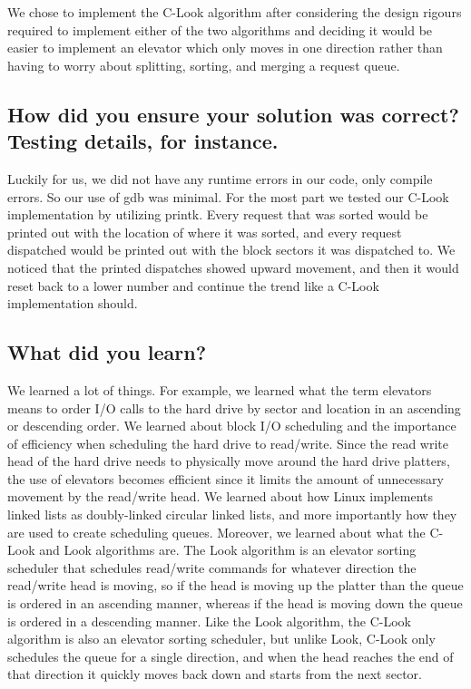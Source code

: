 \documentclass[onecolumn, draftclsnofoot,10pt, compsoc]{IEEEtran}
\begin{document}
We chose to implement the C-Look algorithm after considering the design rigours required to implement either of the two algorithms and deciding it would be easier to implement an elevator which only moves in one direction rather than having to worry about splitting, sorting, and merging a request queue.

\subsection{How did you ensure your solution was correct? Testing details, for instance.}

Luckily for us, we did not have any runtime errors in our code, only compile errors. So our use of gdb was minimal. For the most part we tested our C-Look implementation by utilizing printk. Every request that was sorted would be printed out with the location of where it was sorted, and every request dispatched would be printed out with the block sectors it was dispatched to. We noticed that the printed dispatches showed upward movement, and then it would reset back to a lower number and continue the trend like a C-Look implementation should.

\subsection{What did you learn?}

We learned a lot of things. For example, we learned what the term elevators means to order I/O calls to the hard drive by sector and location in an ascending or descending order. We learned about block I/O scheduling and the importance of efficiency when scheduling the hard drive to read/write. Since the read write head of the hard drive needs to physically move around the hard drive platters, the use of elevators becomes efficient since it limits the amount of unnecessary movement by the read/write head. We learned about how Linux implements linked lists as doubly-linked circular linked lists, and more importantly how they are used to create scheduling queues. Moreover, we learned about what the C-Look and Look algorithms are. The Look algorithm is an elevator sorting scheduler that schedules read/write commands for whatever direction the read/write head is moving, so if the head is moving up the platter than the queue is ordered in an ascending manner, whereas if the head is moving down the queue is ordered in a descending manner. Like the Look algorithm, the C-Look algorithm is also an elevator sorting scheduler, but unlike Look, C-Look only schedules the queue for a single direction, and when the head reaches the end of that direction it quickly moves back down and starts from the next sector.
\end{document}
